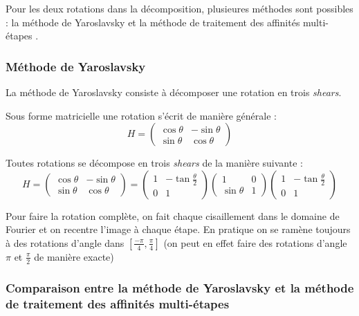
Pour les deux rotations dans la décomposition, plusieures méthodes sont possibles : la méthode de Yaroslavsky \cite{unser1995convolution} et la méthode de traitement des affinités multi-étapes \cite{szeliski2010high}.

\subsubsection{Méthode de Yaroslavsky}

La méthode de Yaroslavsky consiste à décomposer une rotation en trois \emph{shears}.

Sous forme matricielle une rotation s'écrit de manière générale :
\begin{equation*}
	H=\begin{pmatrix}
	\cos \theta&-\sin \theta\\\sin \theta&\cos \theta
	\end{pmatrix}
	\end{equation*}
\begin{prop}
Toutes rotations se décompose en trois \emph{shears} de la manière suivante :
\begin{equation*}
	H=\begin{pmatrix}
	\cos \theta&-\sin \theta\\\sin \theta&\cos \theta
	\end{pmatrix}=\begin{pmatrix}
	1&-\tan \frac{\theta}{2}\\0&1
	\end{pmatrix}\begin{pmatrix}
	1&0\\\sin \theta&1
	\end{pmatrix}\begin{pmatrix}
	1&-\tan \frac{\theta}{2}\\0&1
	\end{pmatrix}
	\end{equation*}
\end{prop}

	Pour faire la rotation complète, on fait chaque cisaillement dans le domaine de Fourier et on recentre l'image à chaque étape. 
	En pratique on se ramène toujours à des rotations d'angle dans $[\frac{-\pi}{4},\frac{\pi}{4}]$ (on peut en effet faire des rotations d'angle $\pi$ et $\frac{\pi}{2}$ de manière exacte)  


\subsubsection{Comparaison entre la méthode de Yaroslavsky et la méthode de traitement des affinités multi-étapes}

